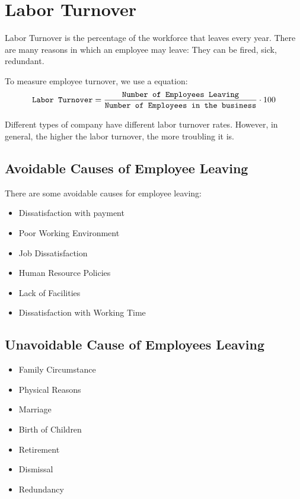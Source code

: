 \documentclass{standalone}
\begin{document}
\section{Labor Turnover}\label{LaborTurnover}
Labor Turnover is the percentage of the workforce that leaves every year.
There are many reasons in which an employee may leave:
They can be fired, sick, redundant.

To measure employee turnover, we use a equation:
\begin{equation}
	\texttt{Labor Turnover} = \frac{\texttt{Number of Employees Leaving}}{ \texttt{Number of Employees in the business} } \cdot 100 \\
\end{equation}

Different types of company have different labor turnover rates. 
However, in general, the higher the labor turnover, the more troubling it is.

\subsection{Avoidable Causes of Employee Leaving}
There are some avoidable causes for employee leaving:
\begin{itemize}
	\item Dissatisfaction with payment
	\item Poor Working Environment
	\item Job Dissatisfaction
	\item Human Resource Policies
	\item Lack of Facilities
	\item Dissatisfaction with Working Time
\end{itemize}

\subsection{Unavoidable Cause of Employees Leaving}
\begin{itemize}
	\item Family Circumstance
	\item Physical Reasons
	\item Marriage
	\item Birth of Children
	\item Retirement
	\item Dismissal
	\item Redundancy
\end{itemize}
\end{document}
